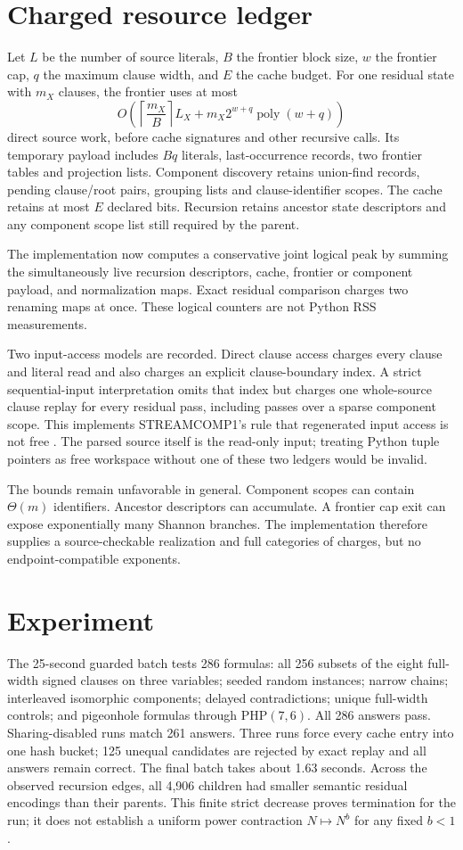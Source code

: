 \documentclass[11pt]{article}
\begin{document}
\section{Charged resource ledger}
Let $L$ be the number of source literals, $B$ the frontier block size, $w$ the
frontier cap, $q$ the maximum clause width, and $E$ the cache budget.  For one
residual state with $m_X$ clauses, the frontier uses at most
\[
 O\!\left(\left\lceil\frac{m_X}{B}\right\rceil L_X
   +m_X2^{w+q}\operatorname{poly}(w+q)\right)
\]
direct source work, before cache signatures and other recursive calls.  Its
temporary payload includes $Bq$ literals, last-occurrence records, two frontier
tables and projection lists.  Component discovery retains union-find records,
pending clause/root pairs, grouping lists and clause-identifier scopes.  The
cache retains at most $E$ declared bits.  Recursion retains ancestor state
descriptors and any component scope list still required by the parent.

The implementation now computes a conservative joint logical peak by summing
the simultaneously live recursion descriptors, cache, frontier or component
payload, and normalization maps.  Exact residual comparison charges two
renaming maps at once.  These logical counters are not Python RSS measurements.

Two input-access models are recorded.  Direct clause access charges every
clause and literal read and also charges an explicit clause-boundary index.
A strict sequential-input interpretation omits that index but charges one
whole-source clause replay for every residual pass, including passes over a
sparse component scope.  This implements STREAMCOMP1's rule that regenerated
input access is not free \cite{streamcomp1}.  The parsed source itself is the
read-only input; treating Python tuple pointers as free workspace without one
of these two ledgers would be invalid.

The bounds remain unfavorable in general.  Component scopes can contain
$\Theta(m)$ identifiers.  Ancestor descriptors can accumulate.  A frontier cap
exit can expose exponentially many Shannon branches.  The implementation
therefore supplies a source-checkable realization and full categories of
charges, but no endpoint-compatible exponents.

\section{Experiment}
The 25-second guarded batch tests 286 formulas: all 256 subsets of the eight
full-width signed clauses on three variables; seeded random instances; narrow
chains; interleaved isomorphic components; delayed contradictions; unique
full-width controls; and pigeonhole formulas through PHP$(7,6)$.  All 286
answers pass.  Sharing-disabled runs match 261 answers.  Three runs force every
cache entry into one hash bucket; 125 unequal candidates are rejected by exact
replay and all answers remain correct.  The final batch takes about 1.63 seconds.
Across the observed recursion edges, all 4,906 children had smaller semantic
residual encodings than their parents.  This finite strict decrease proves
termination for the run; it does not establish a uniform power contraction
$N\mapsto N^b$ for any fixed $b<1$.
\end{document}
